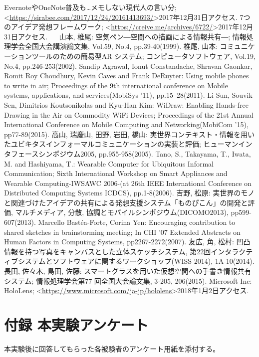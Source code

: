 \documentclass[11pt,a4j, titlepage]{jarticle} %
\begin{document}
\newpage
\begin{thebibliography}{数字}
   EvernoteやOneNote普及も…メモしない現代人の言い分; \textless\url{https://sirabee.com/2017/12/24/20161413693/}\textgreater2017年12月31日アクセス.
   7つのアイデア発想フレームワーク; \textless\url{https://creive.me/archives/6722/}\textgreater2017年12月31日アクセス.
　 山本, 椎尾: 空気ペン―空間への描画による情報共有―; 情報処理学会全国大会講演論文集, Vol.59, No.4,
pp.39-40(1999).
   椎尾, 山本: コミュニケーションツールのための簡易型AR システム; コンピュータソフトウェア, Vol.19,
No.4, pp.246-253(2002).
   Sandip Agrawal, Ionut Constandache, Shravan Gaonkar, Romit Roy Choudhury, Kevin Caves and Frank DeRuyter: Using mobile phones to write in air; Proceedings of the 9th international conference on Mobile systems, applications, and services(MobiSys '11), pp.15–28(2011).
   Li Sun, Souvik Sen, Dimitrios Koutsonikolas and Kyu-Han Kim: WiDraw: Enabling Hands-free Drawing in the Air on Commodity WiFi Devices; Proceedings of the 21st Annual International Conference on Mobile Computing and Networking(MobiCom '15), pp77-89(2015).
   高山, 瑞慶山, 田野, 岩田, 橋山: 実世界コンテキスト・情報を用いたユビキタスインフォーマルコミュニケーションの実装と評価; ヒューマンインタフェースシンポジウム2005, pp.955-958(2005).
   Tano, S., Takayama, T., Iwata, M. and Hashiyama, T.: Wearable Computer for Ubiquitous Informal Communication; Sixth International Workshop on Smart Appliances and Wearable Computing-IWSAWC 2006-(at 26th IEEE International Conference on Distributed Computing Systems
ICDCS), pp.1-8(2006).
   吉野, 松原: 実世界のモノと関連づけたアイデアの共有による発想支援システム「ものぴこん」の開発と評価, マルチメディア, 分散, 協調とモバイルシンポジウム(DICOMO2013), pp599-607(2013).
   	Marcello Bast\'ea-Forte, Corina Yen: Encouraging contribution to shared sketches in brainstorming meeting; In CHI '07 Extended Abstracts on Human Factors in Computing Systems, pp2267-2272(2007). 
   友広, 角, 松村: 凹凸情報を持つ写真をキャンバスとした立体スケッチシステム, 第22回インタラクティブシステムとソフトウェアに関するワークショップ(WISS 2014), 1A-10(2014).
   長田, 佐々木, 島田, 佐藤: スマートグラスを用いた仮想空間への手書き情報共有システム; 情報処理学会第77 回全国大会論文集, 3-205, 206(2015).
   Microsoft Inc: HoloLens; \textless\url{https://www.microsoft.com/ja-jp/hololens}\textgreater2018年1月2日アクセス.
\end{thebibliography}

\newpage
\section*{付録 本実験アンケート}
本実験後に回答してもらった各被験者のアンケート用紙を添付する。
\end{document}
